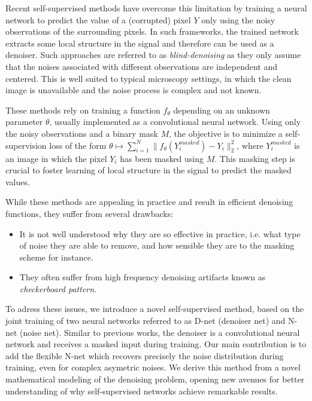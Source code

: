 \documentclass{article}
\begin{document}
Recent self-supervised methods have overcome this limitation \cite{batson2019noise2self,krull2018noise2void} by training a neural network to predict the value of a (corrupted) pixel $Y$ only using the noisy observations of the surrounding pixels. In such frameworks, the trained network extracts some local structure in the signal and therefore can be used as a denoiser. Such approaches are referred to as \textit{blind-denoising} as they only assume that the noises associated with different observations are independent and centered.
This is well suited to typical microscopy settings, in which the clean image is unavailable and the noise process is complex and not known.

These methods rely on training a function $f_\theta$ depending on an unknown parameter $\theta$, usually implemented as a convolutional neural network. Using only the noisy observations and a binary mask $M$, the objective is to minimize a self-supervision loss of the form $\theta\mapsto \sum_{i=1}^N \|f_\theta(Y^{masked}_i) - Y_i\|_2^2$,
where $Y^{masked}_i$ is an image in which the pixel $Y_i$ has been masked using $M$. This masking step is crucial to foster learning of local structure in the signal to predict the masked values.

While these methods are appealing in practice and result in efficient denoising functions, they suffer from several drawbacks:
\begin{itemize}
  \item It is not well understood why they are so effective in practice, i.e. what type of noise they are able to remove, and how sensible they are to the masking scheme for instance.
  \item They often suffer from high frequency denoising artifacts known as \textit{checkerboard pattern}.
\end{itemize}

To adress these issues, we introduce a novel self-supervised method, based on the joint training of two neural networks referred to as D-net (denoiser net) and N-net (noise net). Similar to previous works, the denoiser is a convolutional neural network and receives a masked input during training.
Our main contribution is to add the flexible N-net which recovers precisely the noise distribution during training, even for complex asymetric noises.
We derive this method from a novel mathematical modeling of the denoising problem, opening new avenues for better understanding of why self-supervised networks achieve remarkable results.
\end{document}
